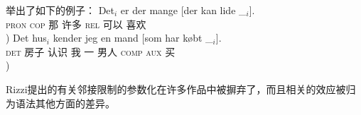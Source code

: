 \citet[]{Erteschik73a-u}举出了如下的例子：
\eal
\label{Beispiel-Extraktion-Adjunkt}
\ex
\gll Det$_i$ er   der mange [der kan lide \_$_i$].\\
     \textsc{pron} \textsc{cop} 那  许多 \hspaceThis{[}\textsc{rel} 可以 喜欢\\
)
\ex
\gll Det    hus$_i$  kender jeg en    mand [som har købt \_$_i$].\\
     \textsc{det}   房子  认识  我 一 男人 \hspaceThis{[}\textsc{comp} \textsc{aux} 买\\
)
\zl

Rizzi提出的有关邻接限制的参数化在许多作品中被摒弃了，而且相关的效应被归为语法其他方面的差异\citep{Adams84a,CMC83a,Grimshaw86b,Kluender92a}。

